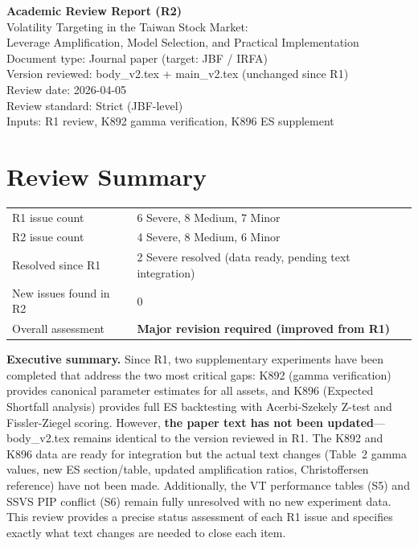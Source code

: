 \documentclass[12pt,a4paper]{article}
\begin{document}
\begin{center}
{\Large\bfseries Academic Review Report (R2)}\\[0.5em]
{\large Volatility Targeting in the Taiwan Stock Market:\\Leverage Amplification, Model Selection, and Practical Implementation}\\[0.5em]
{\normalsize Document type: Journal paper (target: JBF / IRFA)}\\
{\normalsize Version reviewed: body\_v2.tex + main\_v2.tex (unchanged since R1)}\\
{\normalsize Review date: 2026-04-05}\\
{\normalsize Review standard: Strict (JBF-level)}\\
{\normalsize Inputs: R1 review, K892 gamma verification, K896 ES supplement}
\end{center}

\bigskip

\section*{Review Summary}

\begin{tabular}{ll}
R1 issue count & 6 Severe, 8 Medium, 7 Minor \\
R2 issue count & 4 Severe, 8 Medium, 6 Minor \\
Resolved since R1 & 2 Severe resolved (data ready, pending text integration) \\
New issues found in R2 & 0 \\
Overall assessment & \textbf{Major revision required (improved from R1)} \\
\end{tabular}

\bigskip

\noindent\textbf{Executive summary.} Since R1, two supplementary experiments have been completed that address the two most critical gaps: K892 (gamma verification) provides canonical parameter estimates for all assets, and K896 (Expected Shortfall analysis) provides full ES backtesting with Acerbi-Szekely Z-test and Fissler-Ziegel scoring. However, \textbf{the paper text has not been updated}---body\_v2.tex remains identical to the version reviewed in R1. The K892 and K896 data are ready for integration but the actual text changes (Table~2 gamma values, new ES section/table, updated amplification ratios, Christoffersen reference) have not been made. Additionally, the VT performance tables (S5) and SSVS PIP conflict (S6) remain fully unresolved with no new experiment data. This review provides a precise status assessment of each R1 issue and specifies exactly what text changes are needed to close each item.
\end{document}

